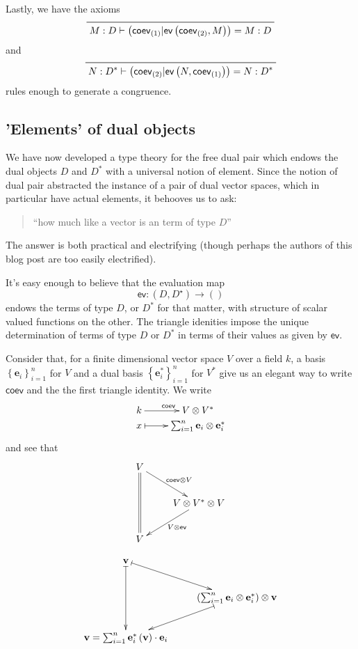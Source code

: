 \documentclass[pra,floatfix,
amsmath,superscriptaddress, 12pt]{article}
\theoremstyle{definition}
\newcommand{\evmap}{\mathsf{ev}}
\newcommand{\coev}{\mathsf{coev}}
\begin{document}
Lastly, we have the axioms 
\[
\prftree{}{M:D\vdash\left(\coev_{\left(1\right)}|\evmap\left(\coev_{\left(2\right)},M\right)\right)=M:D}
\]
and 
\[
\prftree{}{N:D^{*}\vdash\left(\coev_{\left(2\right)}|\evmap\left(N,\coev_{\left(1\right)}\right)\right)=N:D^{*}}
\]
rules enough to generate a congruence.

\subsection{'Elements' of dual objects}
We have now developed a type theory for the free dual pair which endows
the dual objects $D$ and $D^{*}$ with a universal notion of element.
Since the notion of dual pair abstracted the instance of a pair of
dual vector spaces, which in particular have actual elements, it behooves
us to ask:
\begin{quotation}
``how much like a vector is an term of type $D$''
\end{quotation}
The answer is both practical and electrifying (though perhaps the
authors of this blog post are too easily electrified).

\par

It's easy enough to believe that the evaluation map 
\[
\evmap:\left(D,D^{\star}\right)\longrightarrow\left(\right)
\]
 endows the terms of type $D$, or $D^{*}$ for that matter, with
structure of scalar valued functions on the other. The triangle idenities impose the unique determination of terms of type $D$ or $D^*$ in terms of their values as given by $\evmap$.

\par

Consider that, for a finite dimensional vector space $V$ over a field
$k$, a basis $\left\{ \mathbf{e}_{i}\right\} _{i=1}^{n}$ for $V$
and a dual basis $\left\{ \mathbf{e}_{i}^{*}\right\} _{i=1}^{n}$
for $V^{*}$ give us an elegant way to write $\coev$ and the the
first triangle identity. We write
\[
\xymatrixrowsep{0pc}\xymatrix{k\ar[r]^{\coev} & V\otimes V^{*}\\
x\ar@{|->}[r] & \sum_{i=1}^{n}\mathbf{e}_{i}\otimes\mathbf{e}_{i}^{*}
}
\]
and see that
\[
\begin{split}\vcenter{\vbox{\xymatrix{V\ar@{=}[dd]\ar[dr]^{\coev\otimes V}\\
 & V\otimes V^{*}\otimes V\ar[dl]^{V\otimes\evmap}\\
V
}
}}
\end{split}
\]

\[
\vcenter{\vbox{\xymatrix{\mathbf{v}\ar@{|->}[dd]\ar@{|->}[dr]\\
 & \left(\sum_{i=1}^{n}\mathbf{e}_{i}\otimes\mathbf{e}_{i}^{*}\right)\otimes\mathbf{v}\ar@{|->}[dl]\\
\mathbf{v}=\sum_{i=1}^{n}\mathbf{e}_{i}^{*}\left(\mathbf{v}\right)\cdot\mathbf{e}_{i}
}
}}
\]
\end{document}
